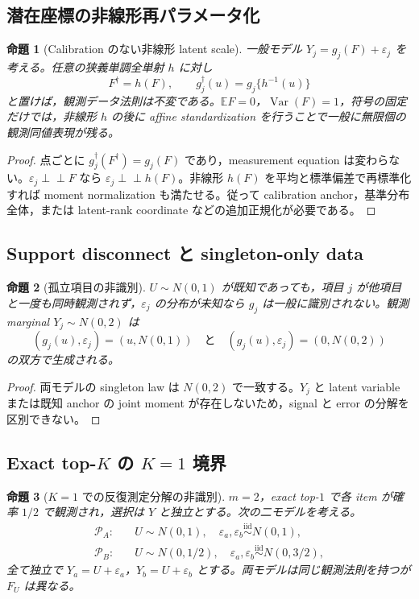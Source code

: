 \documentclass[11pt,a4paper]{ltjsarticle}
\newtheorem{proposition}{命題}[section]
\theoremstyle{remark}
\newcommand{\E}{\mathbb E}
\newcommand{\ind}{\perp\!\!\!\perp}
\newcommand{\cP}{\mathcal P}
\newcommand{\Var}{\operatorname{Var}}
\begin{document}
\subsection{潜在座標の非線形再パラメータ化}
\begin{proposition}[Calibration のない非線形 latent scale]\label{prop:reparam2}
一般モデル $Y_j=g_j(F)+\varepsilon_j$ を考える。任意の狭義単調全単射 $h$ に対し
\[
F^\dagger=h(F),\qquad
g_j^\dagger(u)=g_j\{h^{-1}(u)\}
\]
と置けば，観測データ法則は不変である。$\E F=0$，$\Var(F)=1$，符号の固定だけでは，非線形 $h$ の後に affine standardization を行うことで一般に無限個の観測同値表現が残る。
\end{proposition}

\begin{proof}
点ごとに $g_j^\dagger(F^\dagger)=g_j(F)$ であり，measurement equation は変わらない。$\varepsilon_j\ind F$ なら $\varepsilon_j\ind h(F)$。非線形 $h(F)$ を平均と標準偏差で再標準化すれば moment normalization も満たせる。従って calibration anchor，基準分布全体，または latent-rank coordinate などの追加正規化が必要である。
\end{proof}

\subsection{Support disconnect と singleton-only data}
\begin{proposition}[孤立項目の非識別]\label{prop:isolated2}
$U\sim N(0,1)$ が既知であっても，項目 $j$ が他項目と一度も同時観測されず，$\varepsilon_j$ の分布が未知なら $g_j$ は一般に識別されない。観測 marginal $Y_j\sim N(0,2)$ は
\[
(g_j(u),\varepsilon_j)=(u,N(0,1))
\quad\text{と}\quad
(g_j(u),\varepsilon_j)=(0,N(0,2))
\]
の双方で生成される。
\end{proposition}

\begin{proof}
両モデルの singleton law は $N(0,2)$ で一致する。$Y_j$ と latent variable または既知 anchor の joint moment が存在しないため，signal と error の分解を区別できない。
\end{proof}

\subsection{\texorpdfstring{Exact top-$K$ の $K=1$ 境界}{Exact top-K の K=1 境界}}
\begin{proposition}[$K=1$ での反復測定分解の非識別]\label{prop:k1again}
$m=2$，exact top-$1$ で各 item が確率 $1/2$ で観測され，選択は $Y$ と独立とする。次の二モデルを考える。
\begin{align*}
\cP_A:&\quad U\sim N(0,1),\quad
\varepsilon_a,\varepsilon_b\stackrel{\mathrm{iid}}\sim N(0,1),\\
\cP_B:&\quad U\sim N(0,1/2),\quad
\varepsilon_a,\varepsilon_b\stackrel{\mathrm{iid}}\sim N(0,3/2),
\end{align*}
全て独立で $Y_a=U+\varepsilon_a$，$Y_b=U+\varepsilon_b$ とする。両モデルは同じ観測法則を持つが $F_U$ は異なる。
\end{proposition}
\end{document}
